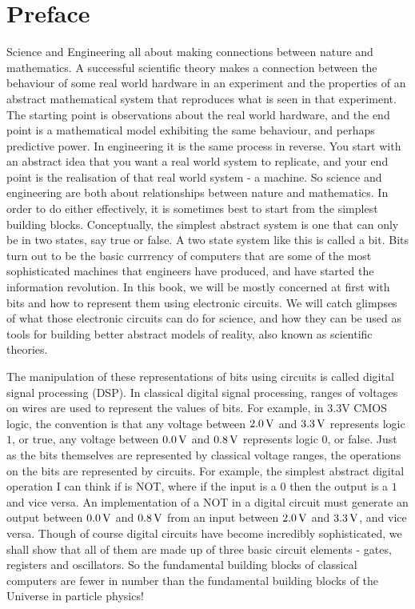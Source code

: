 \documentclass[../physical_computing.tex]{subfiles}
\begin{document}
\chapter*{Preface}
Science and Engineering all about making connections between nature and mathematics. A successful scientific theory makes a connection between the behaviour of some real world hardware in an experiment and the properties of an abstract mathematical system that reproduces what is seen in that experiment. The starting point is observations about the real world hardware, and the end point is a mathematical model exhibiting the same behaviour, and perhaps predictive power. In engineering it is the same process in reverse. You start with an abstract idea that you want a real world system to replicate, and your end point is the realisation of that real world system - a machine. So science and engineering are both about relationships between nature and mathematics. In order to do either effectively, it is sometimes best to start from the simplest building blocks. Conceptually, the simplest abstract system is one that can only be in two states, say true or false. A two state system like this is called a bit. Bits turn out to be the basic currrency of computers that are some of the most sophisticated machines that engineers have produced, and have started the information revolution. In this book, we will be mostly concerned at first with bits and how to represent them using electronic circuits. We will catch glimpses of what those electronic circuits can do for science, and how they can be used as tools for building better abstract models of reality, also known as scientific theories.

The manipulation of these representations of bits using circuits is called digital signal processing (DSP). In classical digital signal processing, ranges of voltages on wires are used to represent the values of bits. For example, in 3.3V CMOS logic, the convention is that any voltage between $\rm 2.0\,V$ and $\rm 3.3\,V$ represents logic $1$, or true, any voltage between $\rm 0.0\,V$ and $\rm 0.8\,V$ represents logic $0$, or false. Just as the bits themselves are represented by classical voltage ranges, the operations on the bits are represented by circuits. For example, the simplest abstract digital operation I can think if is NOT, where if the input is a $0$ then the output is a $1$ and vice versa. An implementation of a NOT in a digital circuit must generate an output between $\rm 0.0\,V$ and $\rm 0.8\,V$ from an input between $\rm 2.0\,V$ and $\rm 3.3\,V$, and vice versa. Though of course digital circuits have become incredibly sophisticated, we shall show that all of them are made up of three basic circuit elements - gates, registers and oscillators. So the fundamental building blocks of classical computers are fewer in number than the fundamental building blocks of the Universe in particle physics!
\end{document}
